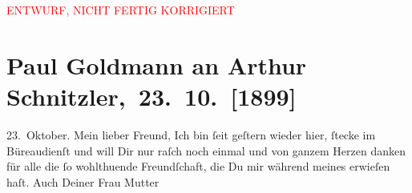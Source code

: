 
\begin{center}
            \textcolor{red}{ENTWURF, NICHT FERTIG KORRIGIERT}
                      \end{center}
            
         
         \renewcommand{\erwaehntePersonen}{Personen: Fedor Mamroth, Louise Schnitzler, Jakob Wassermann}
         \renewcommand{\erwaehnteInstitutionen}{Institutionen: Frankfurter Zeitung, Neue Freie Presse}
         \renewcommand{\erwaehnteOrte}{Orte: Berlin, Frankfurt am Main, Wien}
         \renewcommand{\erwaehnteWerke}{Werke: Agnes Jordan. Schauspiel in fünf Akten, Frankfurter Zeitung, Tagebuch, Wiener Burgtheater. (»Agnes Jordan« von Georg Hirschfeld.)}
               \section[ Paul Goldmann an Arthur Schnitzler, 23. 10. {[}1899{]}]{ Paul Goldmann an Arthur Schnitzler, 23. 10. {[}1899{]}}\nopagebreak{}\rehead{ }\begin{ledgroupsized}[t]{13cm}\normalsize\beginnumbering \toendnotes[C]{\smallbreak\pagebreak[2]} 
\toendnotes[C]{\smallbreak}\pstart
           \centering{}{\pb}23. Oktober.\pend
           \pstart{}Mein lieber Freund,\pend\pstart
           Ich bin ſeit geſtern wieder hier, ſtecke im Büreaudienſt und will Dir nur raſch noch
               einmal und von ganzem Herzen danken für alle die ſo wohlthuende Freundſchaft, die Du
               mir während meines \label{K_L02891-1v}\label{K_L02891-1h} erwieſen haſt.\pend
           \pstart
           Auch Deiner Frau Mutter

\end{ledgroupsized}

